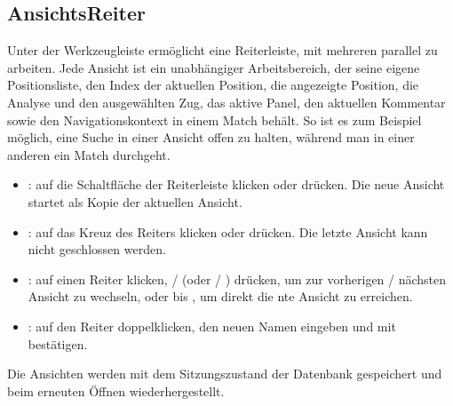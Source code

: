 \documentclass[letterpaper,10pt,german]{sphinxmanual}
\begin{document}
\subsection{Ansichts\sphinxhyphen{}Reiter}
\label{\detokenize{manuel:onglets-de-vues}}\label{\detokenize{manuel:onglets-vues}}
\sphinxAtStartPar
Unter der Werkzeugleiste ermöglicht eine Reiterleiste, mit mehreren  parallel zu arbeiten. Jede Ansicht ist ein unabhängiger Arbeitsbereich, der seine eigene Positionsliste, den Index der aktuellen Position, die angezeigte Position, die Analyse und den ausgewählten Zug, das aktive Panel, den aktuellen Kommentar sowie den Navigationskontext in einem Match behält. So ist es zum Beispiel möglich, eine Suche in einer Ansicht offen zu halten, während man in einer anderen ein Match durchgeht.
\begin{itemize}
\item {} 
\sphinxAtStartPar
{}: auf die Schaltfläche \sphinxstyleemphasis{+} der Reiterleiste klicken oder  drücken. Die neue Ansicht startet als Kopie der aktuellen Ansicht.

\item {} 
\sphinxAtStartPar
{}: auf das Kreuz des Reiters klicken oder  drücken. Die letzte Ansicht kann nicht geschlossen werden.

\item {} 
\sphinxAtStartPar
{}: auf einen Reiter klicken,  /  (oder  / ) drücken, um zur vorherigen / nächsten Ansicht zu wechseln, oder  bis , um direkt die n\sphinxhyphen{}te Ansicht zu erreichen.

\item {} 
\sphinxAtStartPar
{}: auf den Reiter doppelklicken, den neuen Namen eingeben und mit  bestätigen.

\end{itemize}

\sphinxAtStartPar
Die Ansichten werden mit dem Sitzungszustand der Datenbank gespeichert und beim erneuten Öffnen wiederhergestellt.
\end{document}
